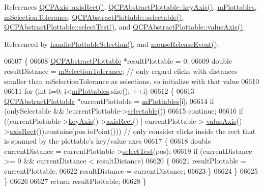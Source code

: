 References \hyperlink{a00116_source_l01702}{Q\+C\+P\+Axis\+::axis\+Rect()}, \hyperlink{a00116_source_l00375}{Q\+C\+P\+Abstract\+Plottable\+::key\+Axis()}, \hyperlink{a00116_source_l02115}{m\+Plottables}, \hyperlink{a00116_source_l02128}{m\+Selection\+Tolerance}, \hyperlink{a00116_source_l00377}{Q\+C\+P\+Abstract\+Plottable\+::selectable()}, \hyperlink{a00024_a0fd218d6c4974b6ab05bd2f688818556}{Q\+C\+P\+Abstract\+Plottable\+::select\+Test()}, and \hyperlink{a00116_source_l00376}{Q\+C\+P\+Abstract\+Plottable\+::value\+Axis()}.



Referenced by \hyperlink{a00115_source_l07856}{handle\+Plottable\+Selection()}, and \hyperlink{a00115_source_l07691}{mouse\+Release\+Event()}.


\begin{DoxyCode}
06607 \{
06608   \hyperlink{a00024}{QCPAbstractPlottable} *resultPlottable = 0;
06609   \textcolor{keywordtype}{double} resultDistance = \hyperlink{a00116_a6694031fcdb13682d098f5d21da86f97}{mSelectionTolerance}; \textcolor{comment}{// only regard clicks with distances
       smaller than mSelectionTolerance as selections, so initialize with that value}
06610   
06611   \textcolor{keywordflow}{for} (\textcolor{keywordtype}{int} i=0; i<\hyperlink{a00116_a57ed6eb2e0a767a8344de45110a3e81d}{mPlottables}.size(); ++i)
06612   \{
06613     \hyperlink{a00024}{QCPAbstractPlottable} *currentPlottable = \hyperlink{a00116_a57ed6eb2e0a767a8344de45110a3e81d}{mPlottables}[i];
06614     \textcolor{keywordflow}{if} (onlySelectable && !currentPlottable->\hyperlink{a00024_af895574da1ec0d050711b6c9deda296a}{selectable}())
06615       \textcolor{keywordflow}{continue};
06616     \textcolor{keywordflow}{if} ((currentPlottable->\hyperlink{a00024_a72c7a09c22963f2c943f07112b311103}{keyAxis}()->\hyperlink{a00025_a7fe5b84f4891838b63ed5181f5811dc5}{axisRect}() | currentPlottable->
      \hyperlink{a00024_a3106f9d34d330a6097a8ec5905e5b519}{valueAxis}()->\hyperlink{a00025_a7fe5b84f4891838b63ed5181f5811dc5}{axisRect}()).contains(pos.toPoint())) \textcolor{comment}{// only consider clicks inside the rect
       that is spanned by the plottable's key/value axes}
06617     \{
06618       \textcolor{keywordtype}{double} currentDistance = currentPlottable->\hyperlink{a00024_a0fd218d6c4974b6ab05bd2f688818556}{selectTest}(pos);
06619       \textcolor{keywordflow}{if} (currentDistance >= 0 && currentDistance < resultDistance)
06620       \{
06621         resultPlottable = currentPlottable;
06622         resultDistance = currentDistance;
06623       \}
06624     \}
06625   \}
06626   
06627   \textcolor{keywordflow}{return} resultPlottable;
06628 \}
\end{DoxyCode}


